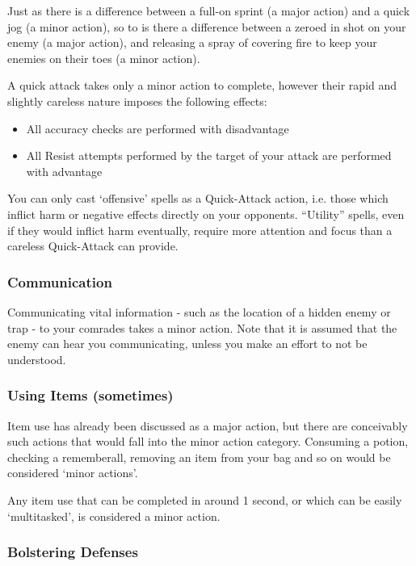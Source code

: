 Just as there is a difference between a full-on sprint (a major action) and a quick jog (a minor action), so to is there a difference between a zeroed in shot on your enemy (a major action), and releasing a spray of covering fire to keep your enemies on their toes (a minor action). 

A quick attack takes only a minor action to complete, however their rapid and slightly careless nature imposes the following effects:
\begin{itemize}
	\item All accuracy checks are performed with disadvantage
	\item All Resist attempts performed by the target of your attack are performed with advantage
\end{itemize}

You can only cast `offensive' spells as a Quick-Attack action, i.e. those which inflict harm or negative effects directly on your opponents. ``Utility'' spells, even if they would inflict harm eventually, require more attention and focus than a careless Quick-Attack can provide. 
 
\subsubsection{Communication}

Communicating vital information - such as the location of a hidden enemy or trap - to your comrades takes a minor action. Note that it is assumed that the enemy can hear you communicating, unless you make an effort to not be understood. 

\subsubsection{Using Items (sometimes)}

Item use has already been discussed as a major action, but there are conceivably such actions that would fall into the minor action category. Consuming a potion, checking a rememberall, removing an item from your bag and so on would be considered `minor actions'. 

Any item use that can be completed in around 1 second, or which can be easily `multitasked', is considered a minor action. 

\subsubsection{Bolstering Defenses}
 
